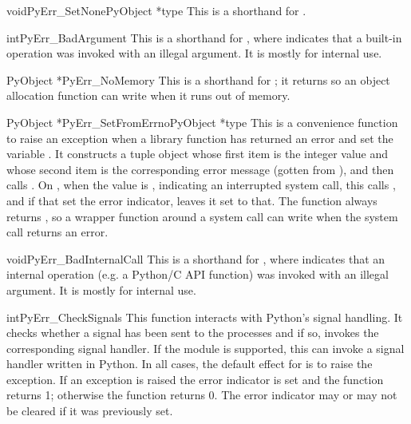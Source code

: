 \documentclass[twoside,openright]{report}
\begin{document}
\begin{cfuncdesc}{void}{PyErr_SetNone}{PyObject *type}
This is a shorthand for .
\end{cfuncdesc}

\begin{cfuncdesc}{int}{PyErr_BadArgument}{}
This is a shorthand for , where  indicates that a built-in operation
was invoked with an illegal argument.  It is mostly for internal use.
\end{cfuncdesc}

\begin{cfuncdesc}{PyObject *}{PyErr_NoMemory}{}
This is a shorthand for ; it
returns \NULL{} so an object allocation function can write
 when  it runs out of memory.
\end{cfuncdesc}

\begin{cfuncdesc}{PyObject *}{PyErr_SetFromErrno}{PyObject *type}
This is a convenience function to raise an exception when a \C{} library
function has returned an error and set the \C{} variable .
It constructs a tuple object whose first item is the integer
 value and whose second item is the corresponding error
message (gotten from ), and then calls
.  On \UNIX{}, when
the  value is , indicating an interrupted
system call, this calls , and if that set
the error indicator, leaves it set to that.  The function always
returns \NULL{}, so a wrapper function around a system call can write 
 when  the system call returns an error.
\end{cfuncdesc}

\begin{cfuncdesc}{void}{PyErr_BadInternalCall}{}
This is a shorthand for , where  indicates that an internal
operation (e.g. a Python/C API function) was invoked with an illegal
argument.  It is mostly for internal use.
\end{cfuncdesc}

\begin{cfuncdesc}{int}{PyErr_CheckSignals}{}
This function interacts with Python's signal handling.  It checks
whether a signal has been sent to the processes and if so, invokes the
corresponding signal handler.  If the  module is
supported, this can invoke a signal handler written in Python.  In all
cases, the default effect for  is to raise the
 exception.  If an exception is raised the
error indicator is set and the function returns 1; otherwise the
function returns 0.  The error indicator may or may not be cleared if
it was previously set.
\end{cfuncdesc}
\end{document}

